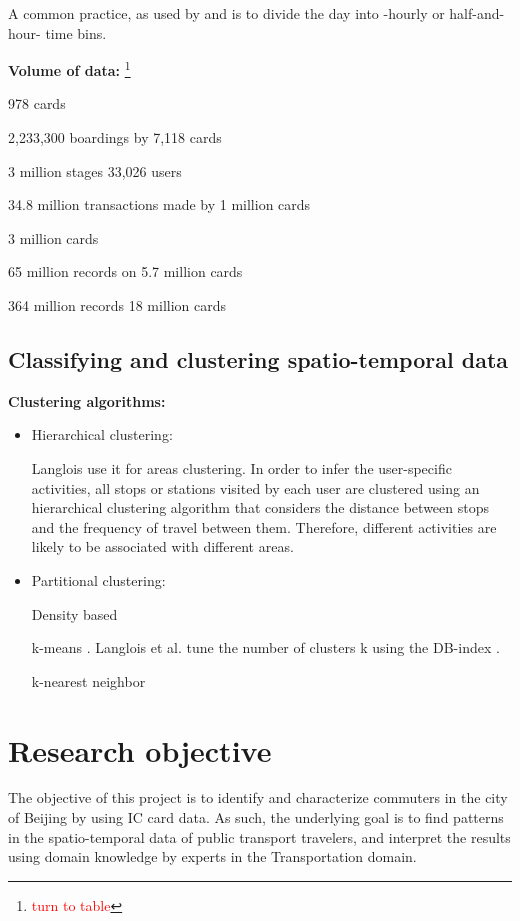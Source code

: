 \documentclass{article}
\newcommand{\selfnote}[1]{\footnote{\textcolor{red}{#1}}}
\begin{document}
A common practice, as used by \cite{ma2017understanding} and \cite{langlois2016inferring} is to divide the day into -hourly or half-and-hour- time bins.

\textbf{Volume of data:} \selfnote{turn to table}

\cite{tu2016impact} 978 cards

\cite{morency2007measuring} 2,233,300 boardings by 7,118 cards 

\cite{langlois2016inferring} 3 million stages 33,026 users

\cite{bhaskar2015passenger} 34.8 million transactions made by 1
million cards

\cite{ma2013mining} 3 million cards

\cite{ortega2013classification} 65 million records on 5.7 million cards

\cite{ma2017understanding} 364 million records 18 million cards



\subsection{Classifying and clustering spatio-temporal data}
\textbf{Clustering algorithms:} 

\begin{itemize}
\item Hierarchical clustering: 

Langlois use it for areas clustering. In order to infer the user-specific activities, all stops or stations visited by each user are clustered using an hierarchical clustering algorithm that considers the distance between stops and the frequency of travel between them. Therefore, different activities are likely to be associated with different areas.  \cite{langlois2016inferring}

\item Partitional clustering:


Density based \cite{bhaskar2015passenger}

k-means \cite{morency2007measuring}. Langlois et al. tune the number of clusters k using the DB-index \cite{langlois2016inferring}. 

k-nearest neighbor \cite{ortega2013classification}


\end{itemize}

\newpage
\section{Research objective}
The objective of this project is to identify and characterize commuters in the city of Beijing by using IC card data. As such, the underlying goal is to find patterns in the spatio-temporal data of public transport travelers, and interpret the results using domain knowledge by experts in the Transportation domain.  
\end{document}
